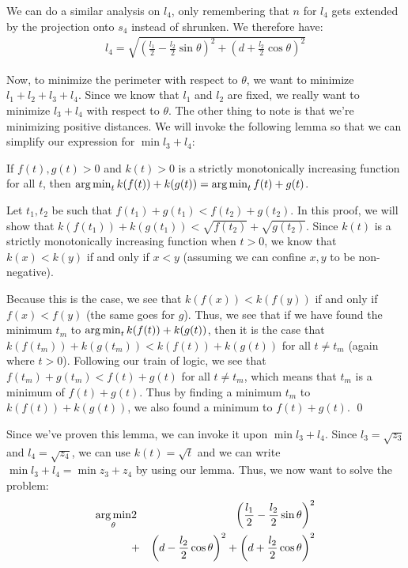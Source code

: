 We can do a similar analysis on $l_4$, only remembering that $n$ for $l_4$ gets extended by the projection onto $s_4$ instead of shrunken. We therefore have:
\begin{eqnarray}
  l_4 = \sqrt{ \left(\frac{l_1}{2} - \frac{l_2}{2} \sin \theta \right)^2 + \left( d + \frac{l_2}{2} \cos \theta \right)^2 }
\end{eqnarray}

Now, to minimize the perimeter with respect to $\theta$, we want to minimize $l_1 + l_2 + l_3 + l_4$. Since we know that $l_1$ and $l_2$ are fixed, we really want to minimize $l_3 + l_4$ with respect to $\theta$. The other thing to note is that we're minimizing positive distances. We will invoke the following lemma so that we can simplify our expression for $\min l_3 + l_4$:

\begin{lemma}
  If $f(t), g(t) > 0$ and $k(t) > 0$ is a strictly monotonically increasing function for all $t$, then $\operatorname*{arg\,min}_t k(f(t)) + k(g(t)) = \operatorname*{arg\,min}_t f(t) + g(t)$.
  \label{lemma:minsqrt}
\end{lemma}
\proof Let $t_1, t_2$ be such that $f(t_1) + g(t_1) < f(t_2) + g(t_2)$. In this proof, we will show that $k(f(t_1)) + k(g(t_1)) < \sqrt{f(t_2)} + \sqrt{g(t_2)}$. Since $k(t)$ is a strictly monotonically increasing function when $t > 0$, we know that $k(x) < k(y)$ if and only if $x < y$ (assuming we can confine $x, y$ to be non-negative).

Because this is the case, we see that $k(f(x)) < k(f(y))$ if and only if $f(x) < f(y)$ (the same goes for $g$). Thus, we see that if we have found the minimum $t_m$ to $\operatorname*{arg\,min}_t k(f(t)) + k(g(t))$, then it is the case that $k(f(t_m)) + k(g(t_m)) < k(f(t)) + k(g(t))$ for all $t \neq t_m$ (again where $t > 0$). Following our train of logic, we see that $f(t_m) + g(t_m) < f(t) + g(t)$ for all $t \neq t_m$, which means that $t_m$ is a minimum of $f(t) + g(t)$. Thus by finding a minimum $t_m$ to $k(f(t)) + k(g(t))$, we also found a minimum to $f(t) + g(t)$. \qed

Since we've proven this lemma, we can invoke it upon $\min l_3 + l_4$. Since $l_3 = \sqrt{z_3}$ and $l_4 = \sqrt{z_4}$, we can use $k(t) = \sqrt{t}$ and we can write $\min l_3 + l_4 = \min z_3 + z_4$ by using our lemma. Thus, we now want to solve the problem:
\begin{eqnarray}
  \operatorname*{arg\,min}_{\theta} &2& \left(\frac{l_1}{2} - \frac{l_2}{2} \sin \theta \right)^2 \\
  &+& \left( d - \frac{l_2}{2} \cos \theta \right)^2 + \left( d + \frac{l_2}{2} \cos \theta \right)^2
\end{eqnarray}

